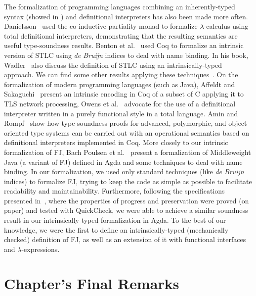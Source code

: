 \documentclass[tese,capa,english]{texufpel}
\begin{document}
The formalization of programming languages combining an inherently-typed syntax (showed in \cite{Altenkirch:1999:MPL:647849.737066, Augustsson99anexercise, Reynolds01whatdo}) and definitional interpreters has also been made more often. Danielsson~\cite{Danielsson:2012:OSU:2364527.2364546} used the co-inductive partiality monad to formalize $\lambda$-calculus using total definitional interpreters, demonstrating that the resulting semantics are useful type-soundness results. Benton et al.~\cite{Benton2012} used Coq to formalize an intrinsic version of STLC using \emph{de Bruijn} indices to deal with name binding. In his book, Wadler~\cite{Wadler-plfa} also discuss the definition of STLC using an intrinsically-typed approach. We can find some other results applying these techniques~\cite{McBride:2010:OBM:1863495.1863497, Altenkirch:2016:TTT:2914770.2837638}. On the formalization of modern programming languages (such as Java), Affeldt and Sakaguchi~\cite{JFR4317} present an intrinsic encoding in Coq of a subset of C applying it to TLS network processing, Owens et al.~\cite{Owens:2016:FBS:3089528.3089551} advocate for the use of a definitional interpreter written in a purely functional style in a total language. Amin and Rompf~\cite{Amin:2017:TSP:3093333.3009866} show how type soundness proofs for advanced, polymorphic, and object-oriented type systems can be carried out with an operational semantics based on definitional interpreters implemented in Coq. More closely to our intrinsic formalization of FJ, Bach Poulsen et al.~\cite{BachPoulsen:2017:IDI:3177123.3158104} present a formalization of Middleweight Java (a variant of FJ) defined in Agda and some techniques to deal with name binding. In our formalization, we used only standard techniques (like \emph{de Bruijn} indices) to formalize FJ, trying to keep the code as simple as possible to facilitate readability and maintainability. Furthermore, following the specifications presented in~\cite{feitosa2018-3}, where the properties of progress and preservation were proved (on paper) and tested with QuickCheck, we were able to achieve a similar soundness result in our intrinsically-typed formalization in Agda. To the best of our knowledge, we were the first to define an intrinsically-typed (mechanically checked) definition of FJ, as well as an extension of it with functional interfaces and $\lambda$-expressions.

\section{Chapter's Final Remarks}
\end{document}
